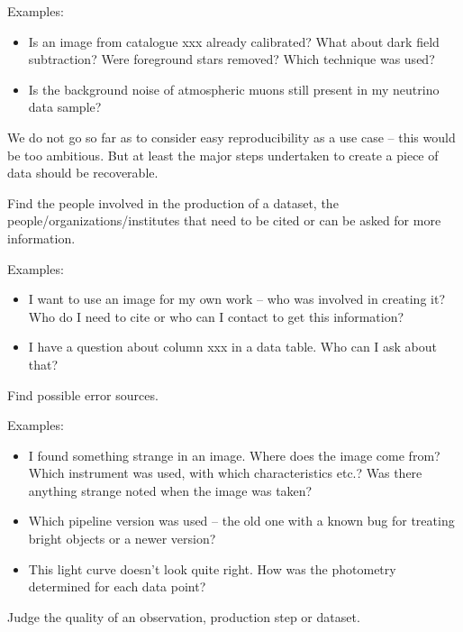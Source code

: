         \noindent Examples: 
        \begin{itemize}
            \item Is an image from catalogue xxx already calibrated?
What about dark field subtraction? Were foreground stars removed? Which technique
was used?  
            
            \item Is the background noise of atmospheric muons still present in my neutrino data sample?  
        \end{itemize}

        We do not go so far as to consider easy reproducibility as a use case -- this would be too ambitious. But at least the 
        major steps undertaken to create a piece of data should be recoverable.


        Find the people involved in the production of a dataset,
        the people/organizations/institutes that need to be cited or can be asked for more information.

        \noindent Examples: 
        \begin{itemize}
            \item I want to use an image for my own work -- who was involved in
creating it? Who do I need to cite or who can I contact to get this information?  
            \item I have a question about column xxx in a data
table. Who can I ask about that?  
        \end{itemize}


        Find possible error sources.

        \noindent Examples:
        \begin{itemize}
            \item I found something strange in an image. Where does
the image come from? Which instrument was used, with which characteristics
etc.? Was there anything strange noted when the image was taken?  
            \item Which pipeline version was used -- the old one
with a known bug for treating bright objects or a newer version?  
            \item This light curve doesn't look quite right. How was
the photometry determined for each data point?  
        \end{itemize}


        Judge the quality of an observation, production step or dataset.
        
